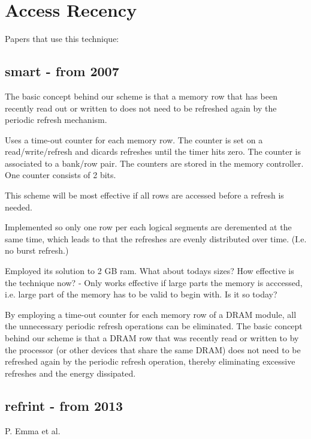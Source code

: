 \section{Access Recency}
\label{sec:acc}

Papers that use this technique:

\subsection{smart\cite{smartrefresh} - from 2007}

The basic concept behind our scheme is that a memory row that has been recently read out or written to does not need to be refreshed again by the periodic refresh mechanism.

Uses a time-out counter for each memory row. The counter is set on a read/write/refresh and dicards refreshes until the timer hits zero. The counter is associated to a bank/row pair. The counters are stored in the memory controller. One counter consists of 2 bits.

This scheme will be most effective if all rows are accessed before a refresh is needed.

Implemented so only one row per each logical segments are deremented at the same time, which leads to that the refreshes are evenly distributed over time. (I.e. no burst refresh.)



Employed its solution to 2 GB ram. What about todays sizes? How effective is the technique now? - Only works effective if large parts the memory is acccessed, i.e. large part of the memory has to be valid to begin with. Is it so today?

By employing a time-out counter for each memory row of a DRAM module, all the unnecessary periodic refresh operations can be eliminated. The basic concept behind our scheme is that a DRAM row that was recently read or written to by the processor (or other devices that share the same DRAM) does not need to be refreshed again by the periodic refresh operation, thereby eliminating excessive refreshes and the energy dissipated.

\subsection{refrint\cite{refrint} - from 2013}

P. Emma et al.